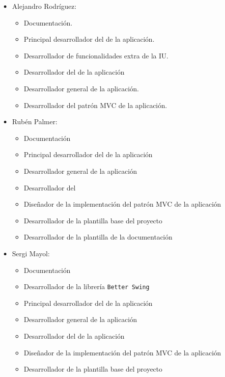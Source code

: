 \documentclass[12pt,journal,compsoc]{IEEEtran}
\begin{document}
\begin{itemize}
    \item Alejandro Rodríguez:
    \begin{itemize}
        \item Documentación.
        \item Principal desarrollador del  de la aplicación.
        \item Desarrollador de funcionalidades extra de la IU.
        \item Desarrollador del  de la aplicación
        \item Desarrollador general de la aplicación.
        \item Desarrollador del patrón MVC de la aplicación.
    \end{itemize}
    
    \item Rubén Palmer:
    \begin{itemize}
        \item Documentación
        \item Principal desarrollador del  de la aplicación
        \item Desarrollador general de la aplicación
        \item Desarrollador del 
        \item Diseñador de la implementación del patrón MVC de la aplicación
        \item Desarrollador de la plantilla base del proyecto
        \item Desarrollador de la plantilla de la documentación 
    \end{itemize}
    \item Sergi Mayol:
    \begin{itemize}
        \item Documentación
        \item Desarrollador de la librería \texttt{Better Swing}
        \item Principal desarrollador del  de la aplicación
        \item Desarrollador general de la aplicación
        \item Desarrollador del  de la aplicación
        \item Diseñador de la implementación del patrón MVC de la aplicación
        \item Desarrollador de la plantilla base del proyecto
    \end{itemize}
\end{itemize}
\end{document}
